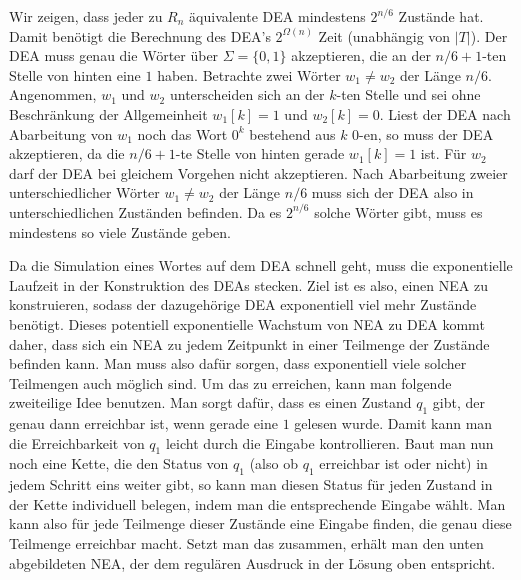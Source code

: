 Wir zeigen, dass jeder zu $R_n$ äquivalente DEA mindestens $2^{n/6}$
Zustände hat.  Damit benötigt die Berechnung des DEA's $2^{\Omega(n)}$
Zeit (unabhängig von $|T|$).  Der DEA muss genau die Wörter über
$\Sigma = \{0, 1\}$ akzeptieren, die an der $n/6+1$-ten Stelle von
hinten eine $1$ haben.  Betrachte zwei Wörter $w_1\not= w_2$ der Länge
$n/6$.  Angenommen, $w_1$ und $w_2$ unterscheiden sich an der $k$-ten
Stelle und sei ohne Beschränkung der Allgemeinheit $w_1[k] = 1$ und
$w_2[k] = 0$.  Liest der DEA nach Abarbeitung von $w_1$ noch das Wort
$0^{k}$ bestehend aus $k$ $0$-en, so muss der DEA akzeptieren, da die
$n/6+1$-te Stelle von hinten gerade $w_1[k] = 1$ ist.  Für $w_2$ darf
der DEA bei gleichem Vorgehen nicht akzeptieren.  Nach Abarbeitung
zweier unterschiedlicher Wörter $w_1 \not= w_2$ der Länge $n/6$ muss
sich der DEA also in unterschiedlichen Zuständen befinden.  Da es
$2^{n/6}$ solche Wörter gibt, muss es mindestens so viele Zustände
geben.

\how

Da die Simulation eines Wortes auf dem DEA schnell geht, muss die
exponentielle Laufzeit in der Konstruktion des DEAs stecken.  Ziel ist
es also, einen NEA zu konstruieren, sodass der dazugehörige DEA
exponentiell viel mehr Zustände benötigt.  Dieses potentiell
exponentielle Wachstum von NEA zu DEA kommt daher, dass sich ein NEA
zu jedem Zeitpunkt in einer Teilmenge der Zustände befinden kann.  Man
muss also dafür sorgen, dass exponentiell viele solcher Teilmengen
auch möglich sind.  Um das zu erreichen, kann man folgende zweiteilige
Idee benutzen.  Man sorgt dafür, dass es einen Zustand $q_1$ gibt, der
genau dann erreichbar ist, wenn gerade eine $1$ gelesen wurde.  Damit
kann man die Erreichbarkeit von $q_1$ leicht durch die Eingabe
kontrollieren.  Baut man nun noch eine Kette, die den Status von $q_1$
(also ob $q_1$ erreichbar ist oder nicht) in jedem Schritt eins weiter
gibt, so kann man diesen Status für jeden Zustand in der Kette
individuell belegen, indem man die entsprechende Eingabe wählt.  Man
kann also für jede Teilmenge dieser Zustände eine Eingabe finden, die
genau diese Teilmenge erreichbar macht. Setzt man das zusammen,
erhält man den unten abgebildeten NEA, der dem regulären Ausdruck in
der Lösung oben entspricht.

